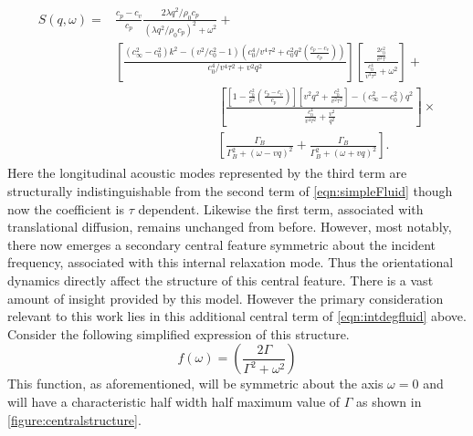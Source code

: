 \begin{align}
\begin{split}
S\left(q,\omega \right )={}& \frac{c_p-c_v}{c_p}\frac{2\lambda q^2/\rho_0c_p}{\left(\lambda q^2/\rho_0c_p \right )^2+\omega^2}+\\
& \left[\frac{\left(c^2_\infty-c^2_0\right )k^2-\left(v^2/c^2_0-1 \right )\left(c^4_0/v^4\tau^2+c^2_0q^2\left(\frac{c_p-c_v}{c_p} \right ) \right )}{c^4_0/v^4\tau^2+v^2q^2}\right]\left[\frac{\frac{2c^2_0}{v^2\tau}}{\frac{c^4_0}{v^4\tau^2}+\omega^2} \right ] +\\
& \qquad \qquad \qquad \qquad \left[\frac{\left[1-\frac{c^2_0}{v^2}\left(\frac{c_p-c_v}{c_p} \right ) \right ]\left[v^2q^2+\frac{c^2_0}{v^2\tau^2} \right ]-\left(c^2_\infty-c^2_0 \right )q^2}{\frac{c^4_0}{v^4\tau^2}+\frac{v^2}{q^2}}
\right ]\times \\
& \qquad \qquad \qquad \qquad
\left[\frac{\Gamma_B}{\Gamma^2_B+\left(\omega-vq \right )^2}+\frac{\Gamma_B}{\Gamma^2_B+\left(\omega+vq \right )^2} \right ].
\end{split}\label{eqn:intdegfluid}
\end{align}
Here the longitudinal acoustic modes represented by the third term are structurally indistinguishable from the second term of \eqn\nolinebreak \ref{eqn:simpleFluid} though now the coefficient is $\tau$ dependent.  Likewise the first term, associated with translational diffusion, remains unchanged from before.  However, most notably, there now emerges a secondary central feature symmetric about the incident frequency, associated with this internal relaxation mode. Thus the orientational dynamics directly affect the structure of this central feature.  There is a vast amount of insight provided by this model.  However the primary consideration relevant to this work lies in this additional central term of \eqn\nolinebreak \ref{eqn:intdegfluid} above.  Consider the following simplified expression of this structure.
\begin{equation}
f\left(\omega \right )=\left(\frac{2\Gamma}{\Gamma^2+\omega^2} \right )\label{eqn:simplecentral}
\end{equation}
This function, as aforementioned, will be symmetric about the axis $\omega=0$ and will have a characteristic half width half maximum value of $\Gamma$ as shown in \fig \nolinebreak \ref{figure:centralstructure}.
